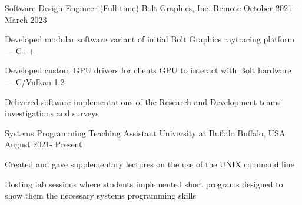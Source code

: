 

\begin{cventries}

  \cventry
    {Software Design Engineer (Full-time)} %
    {\href{https://www.bolt.graphics/}{Bolt Graphics, Inc.} } %
    {Remote} %
    {October 2021 - March 2023} %
    {
      \begin{cvitems} %
        \item Developed modular software variant of initial Bolt Graphics raytracing platform --- C++
        \item Developed custom GPU drivers for clients GPU to interact with Bolt hardware --- C/Vulkan 1.2
        \item Delivered software implementations of the Research and Development teams investigations and surveys
      \end{cvitems}
    }
  \cventry
    {Systems Programming Teaching Assistant} %
    {University at Buffalo} %
    {Buffalo, USA} %
    {August 2021- Present} %
    {
      \begin{cvitems} %
        \item Created and gave supplementary lectures on the use of the UNIX command line
        \item Hosting lab sessions where students implemented short programs designed to show them the necessary systems programming skills
      \end{cvitems}
    }

\end{cventries}
